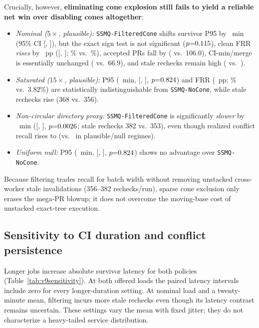 Crucially, however, \textbf{eliminating cone explosion still fails to yield a reliable net win over disabling cones altogether}:
\begin{itemize}
\item \emph{Nominal ($5\times$, plausible):} \texttt{SSMQ-FilteredCone} shifts survivor P95 by \FcNomDeltaP{}~min (95\% CI [\FcNomDeltaPLo{}, \FcNomDeltaPHi{}]), but the exact sign test is not significant ($p{=}0.115{}$), clean FRR \emph{rises} by \FcNomDeltaFrr{}~pp ([\FcNomDeltaFrrLo{}, \FcNomDeltaFrrHi{}]; \FcNomFrr{}\% vs.\ \NomNoConeFrr{}\%), accepted PRs fall by \FcNomDeltaAcc{} (\FcNomAcc{} vs.\ 106.0), CI-min/merge is essentially unchanged (\FcNomCi{} vs.\ 66.9), and stale rechecks remain high (\FcNomStale{} vs.\ \NoConeNomStale{}).
\item \emph{Saturated ($15\times$, plausible):} P95 (\FcSatDeltaP{}~min, [\FcSatDeltaPLo{}, \FcSatDeltaPHi{}], $p{=}0.824{}$) and FRR (\FcSatDeltaFrr{}~pp; \FcSatFrr{}\% vs.\ 3.82\%) are statistically indistinguishable from \texttt{SSMQ-NoCone}, while stale rechecks rise (368 vs.\ 356).
\item \emph{Non-circular directory proxy:} \texttt{SSMQ-FilteredCone} is significantly \emph{slower} by \FcDirDeltaP{}~min ([\FcDirDeltaPLo{}, \FcDirDeltaPHi{}], $p{=}0.0026{}$; stale rechecks 382 vs.\ 353), even though realized conflict recall rises to \FcDirRec{} (vs.\ \FcNomRec{} in plausible/null regimes).
\item \emph{Uniform null:} P95 (\FcNullDeltaP{}~min, [\FcNullDeltaPLo{}, \FcNullDeltaPHi{}], $p{=}0.824{}$) shows no advantage over \texttt{SSMQ-NoCone}.
\end{itemize}
Because filtering trades recall for batch width without removing unstacked cross-worker stale invalidations (356--382 rechecks/run), sparse cone exclusion only erases the mega-PR blowup; it does not overcome the moving-base cost of unstacked exact-tree execution.

\subsection{Sensitivity to CI duration and conflict persistence}

Longer jobs increase absolute survivor latency for both policies (Table~\ref{tab:v9sensitivity}). At both offered loads the paired latency intervals include zero for every longer-duration setting. At nominal load and a twenty-minute mean, filtering incurs more stale rechecks even though its latency contrast remains uncertain. These settings vary the mean with fixed jitter; they do not characterize a heavy-tailed service distribution.

